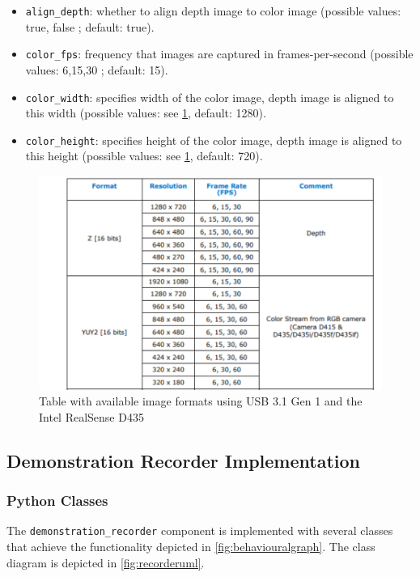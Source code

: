 \documentclass{CSSRforAfrica}
\begin{document}
\begin{itemize}
    \item \texttt{align\_depth}: whether to align depth image to color image (possible values: true, false ; default: true).
    \item \texttt{color\_fps}: frequency that images are captured in frames-per-second (possible values: 6,15,30 ; default: 15).
    \item \texttt{color\_width}: specifies width of the color image, depth image is aligned to this width (possible values: see \cref{fig:resolutions}, default: 1280).  
    \item \texttt{color\_height}: specifies height of the color image, depth image is aligned to this height (possible values: see \cref{fig:resolutions}, default: 720).  
\end{itemize}

\begin{figure}[H]
    \centering
    \includegraphics[width=\textwidth]{figures/realsenseresolutions.png}
    \caption{Table with available image formats using USB 3.1 Gen 1 and the Intel RealSense D435 \cite{intel_realsense_d435}}
    \label{fig:resolutions}
\end{figure}


\newpage
\subsection{Demonstration Recorder Implementation}

\subsubsection*{Python Classes}
The \texttt{demonstration\_recorder} component is implemented with several classes that achieve the functionality depicted in \cref{fig:behaviouralgraph}. The class diagram is depicted in \cref{fig:recorderuml}.
\end{document}
